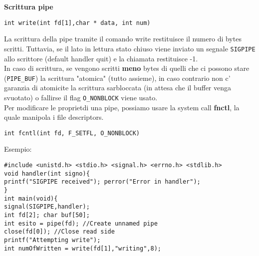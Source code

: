 \begin{flushleft}
\begin{flushleft}
\begin{flushleft}
    \end{flushleft}
    \begin{flushleft}
      \textbf{Scrittura pipe}\par 
      \begin{flushleft}
        \texttt{int write(int fd[1],char * data, int num)}
      \end{flushleft}
      La scrittura della pipe tramite il comando write restituisce il numero di bytes scritti. 
      Tuttavia, se il lato in lettura \ace stato chiuso viene inviato un segnale \texttt{SIGPIPE} allo 
      scrittore (default handler quit) e la chiamata restituisce -1. \\
      In caso di scrittura, se vengono scritti \textbf{meno} bytes di quelli che ci possono stare 
      (\texttt{PIPE\_BUF}) la scrittura \ace "atomica" (tutto assieme), in caso contrario non c'\ace 
      garanzia di atomicit\aca e la scrittura sar\aca bloccata (in attesa che il buffer venga 
      svuotato) o fallir\aca se il flag \texttt{O\_NONBLOCK} viene usato.\\
      Per modificare le propriet\aca di una pipe, possiamo usare la system call \textbf{fnctl}, la 
      quale manipola i file descriptors.\\
      \begin{flushleft}
        \texttt{int fcntl(int fd, F\_SETFL, O\_NONBLOCK)}
      \end{flushleft}
      Esempio:
      \begin{flushleft}
        \texttt{\#include <unistd.h> <stdio.h> <signal.h> <errno.h> <stdlib.h> \\
                void handler(int signo)\{\\
                \halftab printf("SIGPIPE received\n"); perror("Error in handler"); \\
                \}\\
                int main(void)\{\\
                \halftab signal(SIGPIPE,handler);\\
                \halftab int fd[2]; char buf[50];\\
                \halftab int esito = pipe(fd); //Create unnamed pipe\\
                \halftab close(fd[0]); //Close read side\\
                \halftab printf("Attempting write\n");\\
                \halftab int numOfWritten = write(fd[1],"writing",8);\\
}
\end{flushleft}
\end{flushleft}
\end{flushleft}
\end{flushleft}
